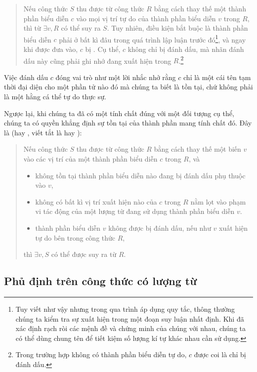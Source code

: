 \begin{quotation}
   Nếu công thức $S$ thu được từ công thức $R$ bằng cách thay thế một thành phần biểu diễn $c$ vào mọi vị trí tự do của thành phần biểu diễn $v$ trong $R$, thì từ $\exists v, R$ có thể suy ra $S$. Tuy nhiên, điều kiện bắt buộc là thành phần biểu diễn $c$ phải  ở bất kì đâu trong quá trình lập luận trước đó\footnote{Tuy viết như vậy nhưng trong qua trình áp dụng quy tắc, thông thường chúng ta kiểm tra sự xuất hiện trong một đoạn suy luận nhất định. Khi đã xác định rạch ròi các mệnh đề và chứng minh của chúng với nhau, chúng ta có thể dùng chung tên để tiết kiệm số lượng kí tự khác nhau cần sử dụng.}, và ngay khi được đưa vào, $c$ bị . Cụ thể, $c$ không chỉ bị đánh dấu, mà nhãn đánh dấu này cũng phải ghi nhớ  đang xuất hiện trong $R$.\footnote{Trong trường hợp không có thành phần biểu diễn tự do, $c$ được coi là chỉ bị đánh dấu.}
\end{quotation}
Việc đánh dấu $c$ đóng vai trò như một lời nhắc nhở rằng $c$ chỉ là một cái tên tạm thời đại diện cho một phần tử nào đó mà chúng ta biết là tồn tại, chứ không phải là một hằng cá thể tự do thực sự.

Ngược lại, khi chúng ta đã có một tính chất đúng với một đối tượng cụ thể, chúng ta có quyền khẳng định sự tồn tại của thành phần mang tính chất đó. Đây là  (hay , viết tắt là  hay ):
\begin{quotation}
   Nếu công thức $S$ thu được từ công thức $R$ bằng cách thay thế một biến $v$ vào các vị trí của một thành phần biểu diễn $c$ trong $R$, và 
   \begin{itemize}
      \item không tồn tại thành phần biểu diễn nào đang bị đánh dấu phụ thuộc vào $v$,
      \item không có bất kì vị trí xuất hiện nào của $c$ trong $R$ nằm lọt vào phạm vi tác động của một lượng từ đang sử dụng thành phần biểu diễn $v$.
      \item thành phần biểu diễn $v$ không được bị đánh dấu, nếu như $v$ xuất hiện tự do bên trong công thức $R$,
   \end{itemize} thì $\exists v, S$ có thể được suy ra từ $R$. 
\end{quotation}

\subsection{Phủ định trên công thức có lượng từ}

